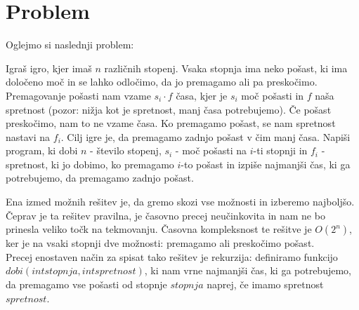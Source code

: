 \section{Problem}\label{sec:problem}
Oglejmo si naslednji problem:
\begin{definition}
    Igraš igro, kjer imaš $n$ različnih stopenj.
    Vsaka stopnja ima neko pošast, ki ima določeno moč in se lahko odločimo, da jo premagamo ali pa preskočimo.
    Premagovanje pošasti nam vzame $s_i \cdot f$ časa, kjer je $s_i$ moč pošasti in $f$ naša spretnost (pozor: nižja kot je spretnost, manj časa potrebujemo).
    Če pošast preskočimo, nam to ne vzame časa.
    Ko premagamo pošast, se nam spretnost nastavi na $f_i$.
    Cilj igre je, da premagamo zadnjo pošast v čim manj časa.
    Napiši program, ki dobi $n$ - število stopenj, $s_i$ - moč pošasti na $i$-ti stopnji in $f_i$ - spretnost, ki jo dobimo, ko premagamo $i$-to pošast in izpiše najmanjši čas, ki ga potrebujemo, da premagamo zadnjo pošast.
\end{definition}
Ena izmed možnih rešitev je, da gremo skozi vse možnosti in izberemo najboljšo.
Čeprav je ta rešitev pravilna, je časovno precej neučinkovita in nam ne bo prinesla veliko točk na tekmovanju.
Časovna kompleksnost te rešitve je $O(2^n)$, ker je na vsaki stopnji dve možnosti: premagamo ali preskočimo pošast.\\
Precej enostaven način za spisat tako rešitev je rekurzija: definiramo funkcijo $dobi(int stopnja, int spretnost)$, ki nam vrne najmanjši čas, ki ga potrebujemo, da premagamo vse pošasti od stopnje $stopnja$ naprej, če imamo spretnost $spretnost$.
